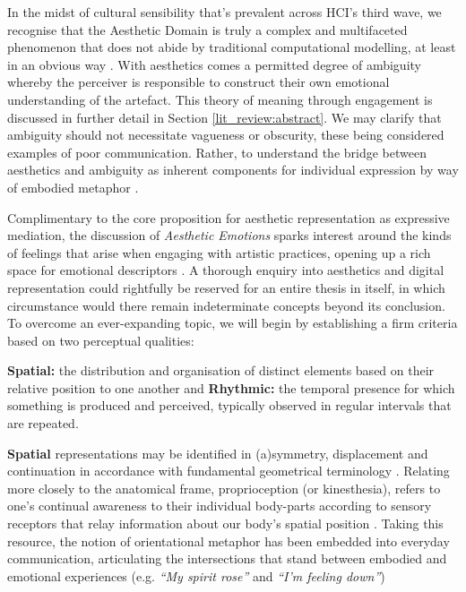 In the midst of cultural sensibility that's prevalent across HCI's third wave, we recognise that the Aesthetic Domain is truly a complex and multifaceted phenomenon that does not abide by traditional computational modelling, at least in an obvious way \cite{bardzell_interaction_2009, rentschler_innate_1999}. With aesthetics comes a permitted degree of ambiguity whereby the perceiver is responsible to construct their own emotional understanding of the artefact. This theory of meaning through engagement is discussed in further detail in Section \ref{lit_review:abstract}. We may clarify that ambiguity should not necessitate vagueness or obscurity, these being considered examples of poor communication. Rather, to understand the bridge between aesthetics and ambiguity as inherent components for individual expression by way of embodied metaphor \cite{dauden_roquet_body_2020,lakoff_metaphors_2003}. 

Complimentary to the core proposition for aesthetic representation as expressive mediation, the discussion of \textit{Aesthetic Emotions} sparks interest around the kinds of feelings that arise when engaging with artistic practices, opening up a rich space for emotional descriptors \cite{schindler_measuring_2017,fingerhut_aesthetic_2020}. A thorough enquiry into aesthetics and digital representation could rightfully be reserved for an entire thesis in itself, in which circumstance would there remain indeterminate concepts beyond its conclusion. To overcome an ever-expanding topic, we will begin by establishing a firm criteria based on two perceptual qualities:

\textbf{Spatial:} the distribution and organisation of distinct elements based on their relative position to one another and \textbf{Rhythmic:} the temporal presence for which something is produced and perceived, typically observed in regular intervals that are repeated.

\textbf{Spatial} representations may be identified in (a)symmetry, displacement and continuation in accordance with fundamental geometrical terminology \cite{mcmanus_symmetry_2005,boselie_general_1984}. Relating more closely to the anatomical frame, proprioception (or kinesthesia), refers to one's continual awareness to their individual body-parts according to sensory receptors that relay information about our body's spatial position \cite{lamkin-kennard_sensors_2019}. Taking this resource, the notion of orientational metaphor has been embedded into everyday communication, articulating the intersections that stand between embodied and emotional experiences \citep{gow_spatial_2001,zlatev_phenomenology_2010} (e.g. \textit{“My spirit rose”} and \textit{“I’m feeling down”})

